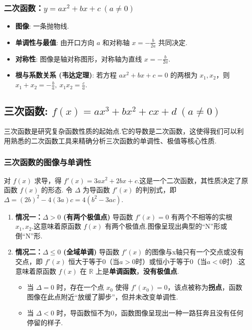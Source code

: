 \subsubsection*{二次函数：$y=ax^2+bx+c \ (a\neq 0)$}
\begin{itemize}
	\item \textbf{图像}: 一条抛物线.
	\item \textbf{单调性与最值}: 由开口方向 $a$ 和对称轴 $x=-\frac{b}{2a}$ 共同决定.
	\item \textbf{对称性}: 图像是轴对称图形，对称轴为直线 $x=-\frac{b}{2a}$.
	\item \textbf{根与系数关系 (韦达定理)}: 若方程 $ax^2+bx+c=0$ 的两根为 $x_1, x_2$，则 $x_1+x_2 = -\frac{b}{a}, \ x_1x_2 = \frac{c}{a}$.
\end{itemize}

\subsection{三次函数: $f(x) = ax^3+bx^2+cx+d \ (a \neq 0)$}

三次函数是研究复杂函数性质的起始点.它的导数是二次函数，这使得我们可以利用熟悉的二次函数工具来精确分析三次函数的单调性、极值等核心性质.

\subsubsection*{三次函数的图像与单调性}
对 $f(x)$ 求导，得 $f'(x) = 3ax^2+2bx+c$.这是一个二次函数，其性质决定了原函数 $f(x)$ 的形态.
令 $\Delta$ 为导函数 $f'(x)$ 的判别式，即 $\Delta = (2b)^2 - 4(3a)c = 4(b^2-3ac)$.

\begin{enumerate}
	\item \textbf{情况一：$\Delta > 0$ (有两个极值点)}
	导函数 $f'(x)=0$ 有两个不相等的实根 $x_1, x_2$.这意味着原函数 $f(x)$ 有两个极值点.图像呈现出典型的“N”形或倒“N”形.
	
	\item \textbf{情况二：$\Delta \le 0$ (全域单调)}
	导函数 $f'(x)$ 的图像与x轴只有一个交点或没有交点，即 $f'(x)$ 恒大于等于0（当$a>0$时）或恒小于等于0（当$a<0$时）.这意味着原函数 $f(x)$ 在 $\mathbb{R}$ 上是\textbf{单调函数}，\textbf{没有极值点}.
	\begin{itemize}
		\item 当 $\Delta=0$ 时，存在一个点 $x_0$ 使得 $f'(x_0)=0$，该点被称为\textbf{拐点}，函数图像在此点附近“放缓了脚步”，但并未改变单调性.
		\item 当 $\Delta<0$ 时，导函数恒不为0，函数图像呈现出一种一路狂奔且没有任何停留的样子.
	\end{itemize}
\end{enumerate}

